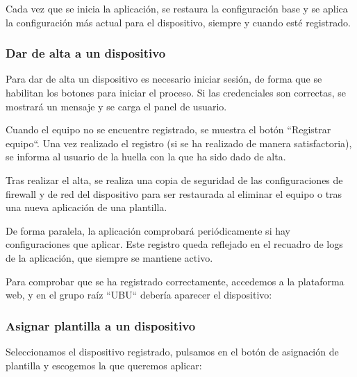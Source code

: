 
Cada vez que se inicia la aplicación, se restaura la configuración base y se aplica la configuración más actual para el
dispositivo, siempre y cuando esté registrado.

\subsubsection{Dar de alta a un dispositivo}

Para dar de alta un dispositivo es necesario iniciar sesión, de forma que se habilitan los botones para iniciar el
proceso.
Si las credenciales son correctas, se mostrará un mensaje y se carga el panel de usuario.



Cuando el equipo no se encuentre registrado, se muestra el botón ``Registrar equipo``.
Una vez realizado el registro (si se ha realizado de manera satisfactoria), se informa al usuario de la huella con
la que ha sido dado de alta.

Tras realizar el alta, se realiza una copia de seguridad de las configuraciones de firewall y de red del dispositivo
para ser restaurada al eliminar el equipo o tras una nueva aplicación de una plantilla.


De forma paralela, la aplicación comprobará periódicamente si hay configuraciones que aplicar.
Este registro queda reflejado en el recuadro de logs de la aplicación, que siempre se mantiene activo.

Para comprobar que se ha registrado correctamente, accedemos a la plataforma web, y en el grupo raíz ``UBU`` debería
aparecer el dispositivo:


\subsubsection{Asignar plantilla a un dispositivo}

Seleccionamos el dispositivo registrado, pulsamos en el botón de asignación de plantilla y escogemos la que
queremos aplicar:


